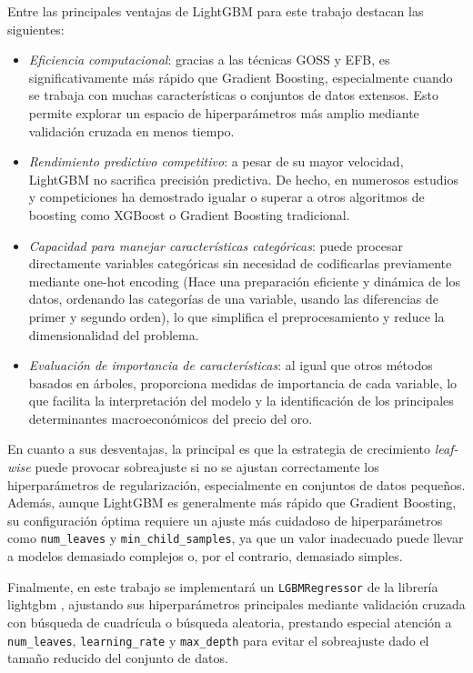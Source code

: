 Entre las principales ventajas de LightGBM para este trabajo destacan las siguientes:

\begin{itemize}
    \item \emph{Eficiencia computacional}: gracias a las técnicas GOSS y EFB, es significativamente más rápido que Gradient Boosting, especialmente cuando se trabaja con muchas características o conjuntos de datos extensos. Esto permite explorar un espacio de hiperparámetros más amplio mediante validación cruzada en menos tiempo.
    \item \emph{Rendimiento predictivo competitivo}: a pesar de su mayor velocidad, LightGBM no sacrifica precisión predictiva. De hecho, en numerosos estudios y competiciones ha demostrado igualar o superar a otros algoritmos de boosting como XGBoost o Gradient Boosting tradicional.
    \item \emph{Capacidad para manejar características categóricas}: puede procesar directamente variables categóricas sin necesidad de codificarlas previamente mediante one-hot encoding (Hace una preparación eficiente y dinámica de los datos, ordenando las categorías de una variable, usando las diferencias de primer y segundo orden), lo que simplifica el preprocesamiento y reduce la dimensionalidad del problema.
    \item \emph{Evaluación de importancia de características}: al igual que otros métodos basados en árboles, proporciona medidas de importancia de cada variable, lo que facilita la interpretación del modelo y la identificación de los principales determinantes macroeconómicos del precio del oro.
\end{itemize}

En cuanto a sus desventajas, la principal es que la estrategia de crecimiento \textit{leaf-wise} puede provocar sobreajuste si no se ajustan correctamente los hiperparámetros de regularización, especialmente en conjuntos de datos pequeños. Además, aunque LightGBM es generalmente más rápido que Gradient Boosting, su configuración óptima requiere un ajuste más cuidadoso de hiperparámetros como \texttt{num\_leaves} y \texttt{min\_child\_samples}, ya que un valor inadecuado puede llevar a modelos demasiado complejos o, por el contrario, demasiado simples.

Finalmente, en este trabajo se implementará un \texttt{LGBMRegressor} de la librería lightgbm \cite{lightgbm}, ajustando sus hiperparámetros principales mediante validación cruzada con búsqueda de cuadrícula o búsqueda aleatoria, prestando especial atención a \texttt{num\_leaves}, \texttt{learning\_rate} y \texttt{max\_depth} para evitar el sobreajuste dado el tamaño reducido del conjunto de datos.

